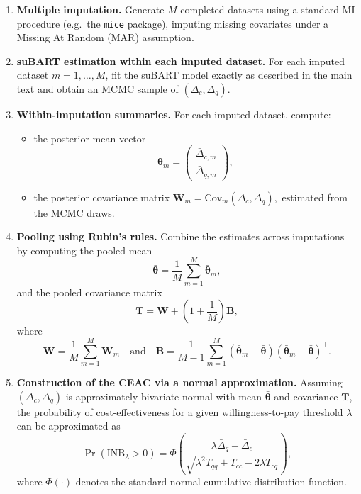 \documentclass[aoas,preprint]{imsart}
\theoremstyle{plain}
\theoremstyle{definition}
\theoremstyle{remark}
\theoremstyle{remark}
\begin{document}
\begin{enumerate}
    \item \textbf{Multiple imputation.}  
    Generate $M$ completed datasets using a standard MI procedure (e.g.\ the \texttt{mice} package), imputing missing covariates under a Missing At Random (MAR) assumption.

    \item \textbf{suBART estimation within each imputed dataset.}  
    For each imputed dataset $m = 1,\dots,M$, fit the suBART model exactly as described in the main text and obtain an MCMC sample of $(\Delta_c, \Delta_q)$.

    \item \textbf{Within-imputation summaries.}  
    For each imputed dataset, compute:
    \begin{itemize}
        \item the posterior mean vector
        \[
        \bar{\boldsymbol{\theta}}_m
        =
        \begin{pmatrix}
        \bar{\Delta}_{c,m} \\
        \bar{\Delta}_{q,m}
        \end{pmatrix},
        \]
        \item the posterior covariance matrix
        \(
        \mathbf{W}_m = \mathrm{Cov}_m(\Delta_c, \Delta_q),
        \)
        estimated from the MCMC draws.
    \end{itemize}

    \item \textbf{Pooling using Rubin’s rules.}  
    Combine the estimates across imputations by computing the pooled mean
    \[
    \bar{\boldsymbol{\theta}} = \frac{1}{M}\sum_{m=1}^M \bar{\boldsymbol{\theta}}_m,
    \]
    and the pooled covariance matrix
    \[
    \mathbf{T} = \mathbf{W} + \left(1 + \frac{1}{M}\right)\mathbf{B},
    \]
    where
    \[
    \mathbf{W} = \frac{1}{M}\sum_{m=1}^M \mathbf{W}_m
    \quad \text{and} \quad
    \mathbf{B} = \frac{1}{M-1}\sum_{m=1}^M
    (\bar{\boldsymbol{\theta}}_m - \bar{\boldsymbol{\theta}})
    (\bar{\boldsymbol{\theta}}_m - \bar{\boldsymbol{\theta}})^\top.
    \]

    \item \textbf{Construction of the CEAC via a normal approximation.}  
    Assuming $(\Delta_c, \Delta_q)$ is approximately bivariate normal with mean $\bar{\boldsymbol{\theta}}$ and covariance $\mathbf{T}$, the probability of cost-effectiveness for a given willingness-to-pay threshold $\lambda$ can be approximated as
    \[
    \Pr(\text{INB}_{\lambda} > 0)
    =
    \Phi\!\left(
    \frac{\lambda \bar{\Delta}_q - \bar{\Delta}_c}
         {\sqrt{\lambda^2 T_{qq} + T_{cc} - 2\lambda T_{cq}}}
    \right),
    \]
    where $\Phi(\cdot)$ denotes the standard normal cumulative distribution function.
\end{enumerate}
\end{document}
